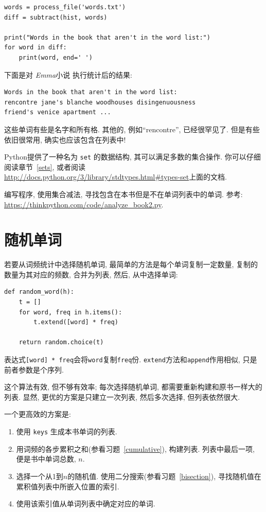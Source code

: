 \documentclass[10pt]{book}
\begin{document}
\begin{verbatim}
words = process_file('words.txt')
diff = subtract(hist, words)

print("Words in the book that aren't in the word list:")
for word in diff:
    print(word, end=' ')
\end{verbatim}
%
下面是对 {\em Emma}小说 执行统计后的结果:

\begin{verbatim}
Words in the book that aren't in the word list:
rencontre jane's blanche woodhouses disingenuousness 
friend's venice apartment ...
\end{verbatim}
%
这些单词有些是名字和所有格. 其他的, 例如``rencontre'', 已经很罕见了. 
但是有些依旧很常用, 确实也应该包含在列表中!

\begin{exercise}

Python提供了一种名为 {\tt set} 的数据结构, 其可以满足多数的集合操作. 
你可以仔细阅读章节~\ref{sets}, 或者阅读
\url{http://docs.python.org/3/library/stdtypes.html#types-set}上面的文档. 

编写程序, 使用集合减法, 寻找包含在本书但是不在单词列表中的单词. 
参考:
\url{https://thinkpython.com/code/analyze_book2.py}.

\end{exercise}


\section{随机单词}
\label{randomwords}

若要从词频统计中选择随机单词, 最简单的方法是每个单词复制一定数量, 
复制的数量为其对应的频数, 合并为列表, 然后, 从中选择单词:

\begin{verbatim}
def random_word(h):
    t = []
    for word, freq in h.items():
        t.extend([word] * freq)

    return random.choice(t)
\end{verbatim}
%
表达式{\tt [word] * freq}会将{\tt word}复制{\tt freq}份. 
{\tt extend}方法和{\tt append}作用相似, 只是前者参数是个序列. 

这个算法有效, 但不够有效率; 每次选择随机单词, 
都需要重新构建和原书一样大的列表. 
显然, 更优的方案是只建立一次列表, 然后多次选择, 但列表依然很大.

一个更高效的方案是:

\begin{enumerate}

\item 使用 {\tt keys} 生成本书单词的列表.

\item 用词频的各步累积之和(参看习题~\ref{cumulative}), 构建列表. 
列表中最后一项, 便是书中单词总数, $n$. 
  
\item 选择一个从1到$n$的随机值. 使用二分搜索(参看习题~\ref{bisection}), 
寻找随机值在累积值列表中所嵌入位置的索引. 

\item 使用该索引值从单词列表中确定对应的单词. 

\end{enumerate}
\end{document}
